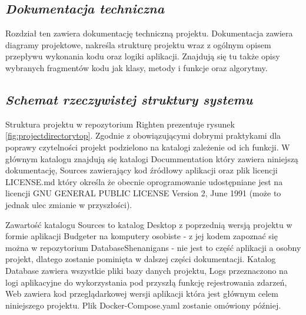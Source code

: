 \documentclass[a4paper, 10pt, twoside, openright]{report}
\newcommand{\customstylechapter}[1]{\large{\textit{#1}}}
\newcommand{\customstylesection}[1]{\textbf{\textit{#1}}}
\begin{document}
\begin{large}
\chapter{\customstylechapter{Dokumentacja techniczna}}
{Rozdział ten zawiera dokumentację techniczną projektu. Dokumentacja zawiera 
diagramy projektowe, nakreśla strukturę projektu wraz z ogólnym opisem przepływu
 wykonania kodu oraz logiki aplikacji. Znajdują się tu także opisy wybranych 
fragmentów kodu jak klasy, metody i funkcje oraz algorytmy.}



\section{\customstylesection{Schemat rzeczywistej struktury systemu}}
{Struktura projektu w repozytorium Righten \cite{GITRighten} prezentuje rysunek 
\ref*{fig:projectdirectorytop}. Zgodnie z obowiązującymi dobrymi praktykami dla 
poprawy czytelności projekt podzielono na katalogi zależenie od ich funkcji. W 
głównym katalogu znajdują się katalogi Docummentation który zawiera niniejszą 
dokumentację, Sources zawierający kod źródłowy aplikacji oraz plik licencji 
LICENSE.md który określa że obecnie oprogramowanie udostępniane jest na licencji
 GNU GENERAL PUBLIC LICENSE Version 2, June 1991 (może to jednak ulec zmianie w 
przyszłości).}

{Zawartość katalogu Sources to katalog Desktop z poprzednią wersją projektu w 
formie aplikacji Budgeter na komputery osobiste - z jej kodem zapoznać się można w 
repozytorium DatabaseShenanigans \cite{GITBudgeterApp} - nie jest to część 
aplikacji a osobny projekt, dlatego zostanie pominięta w dalszej części 
dokumentacji. Katalog Database zawiera wszystkie pliki bazy danych projektu, 
Logs przeznaczono na logi aplikacyjne do wykorzystania pod przyszłą funkcję 
rejestrowania zdarzeń, Web zawiera kod przeglądarkowej wersji aplikacji która 
jest głównym celem niniejszego projektu. Plik Docker-Compose.yaml zostanie 
omówiony później.}


\end{large}
\end{document}
